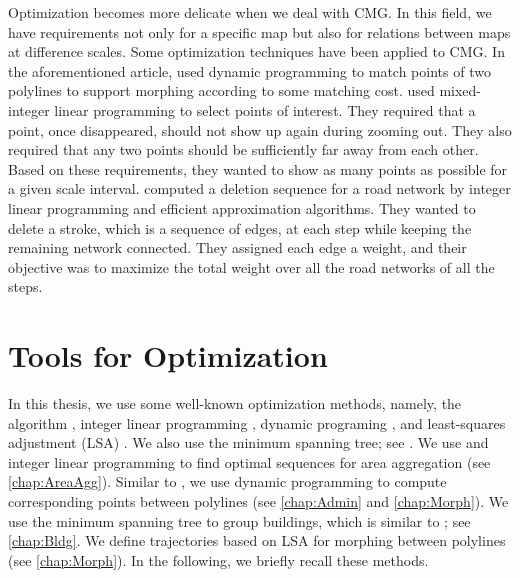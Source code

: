 Optimization becomes more delicate
when we deal with CMG.
In this field, we have requirements 
not only for a specific map
but also for relations between maps at difference scales. 
%
Some optimization techniques have been applied to CMG.
In the aforementioned article,
\textcite{Noellenburg2008} used dynamic programming
to match points of two polylines to support morphing
according to some matching cost.
\textcite{sahw-oarps-ICAGW13} used 
mixed-integer linear programming 
to select points of interest.
They required that a point, once disappeared, 
should not show up again during zooming out. 
They also required that any two points should be 
sufficiently far away from each other.
Based on these requirements, 
they wanted to show as many points as possible 
for a given scale interval.
\textcite{Chimani2014Eat} computed a deletion sequence
for a road network by integer linear programming
and efficient approximation algorithms.
They wanted to delete a stroke, 
which is a sequence of edges, at each step
while keeping the remaining network connected.
They assigned each edge a weight, 
and their objective was to maximize the total weight 
over all the road networks of all the steps.

\section{Tools for Optimization}
\label{sec:Intro_Tools}

In this thesis, we use some well-known optimization methods,
namely, the \Astar algorithm \parencite{Hart1968}, 
integer linear programming
\parencite[]{Papadimitriou1982combinatorial},
dynamic programing \parencite[]{Cormen2009}, and
least-squares adjustment (LSA) \parencite[]{Koch1988}.
We also use the minimum spanning tree;
see \textcite[]{Cormen2009}.
%
We use \Astar and integer linear programming 
to find optimal sequences for 
area aggregation (see \chap\ref{chap:AreaAgg}).
Similar to \textcite{Noellenburg2008},
we use dynamic programming to 
compute corresponding points between polylines
(see \chaps\ref{chap:Admin} and \ref{chap:Morph}).
We use the minimum spanning tree to group buildings,
which is similar to \textcite{Regnauld2001}; 
see \chap\ref{chap:Bldg}.
We define trajectories based on LSA 
for morphing between polylines (see \chap\ref{chap:Morph}).
In the following, we briefly recall these methods.



